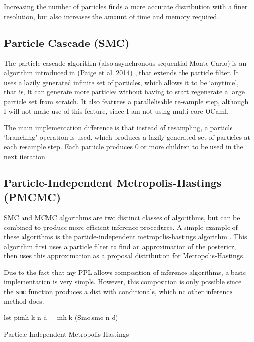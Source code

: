 Increasing the number of particles finds a more accurate distribution with a finer resolution, but also increases the amount of time and memory required.
				
\subsection{Particle Cascade (SMC)} \label{sec:pc}
The particle cascade algorithm (also asynchronous sequential Monte-Carlo) is an algorithm introduced in (Paige et al. 2014) \cite{paige2014asynchronous}, that extends the particle filter. It uses a lazily generated infinite set of particles, which allows it to be `anytime', that is, it can generate more particles without having to start regenerate a large particle set from scratch. It also features a parallelisable re-sample step, although I will not make use of this feature, since I am not using multi-core OCaml.
			
The main implementation difference is that instead of resampling, a particle `branching' operation is used, which produces a lazily generated set of particles at each resample step. Each particle produces 0 or more children to be used in the next iteration.
			
\subsection{Particle-Independent Metropolis-Hastings (PMCMC)} \label{sec:pimh}

SMC and MCMC algorithms are two distinct classes of algorithms, but can be combined to produce more efficient inference procedures. A simple example of these algorithms is the particle-independent metropolis-hastings algorithm \cite{pmcmc}. This algorithm first uses a particle filter to find an approximation of the posterior, then uses this approximation as a proposal distribution for Metropolis-Hastings.

Due to the fact that my PPL allows composition of inference algorithms, a basic implementation is very simple. However, this composition is only possible since the \texttt{smc} function produces a dist with conditionals, which no other inference method does.
				
			\begin{listing}
				\begin{ocamlcode-in}
					let pimh k n d = mh k (Smc.smc n d)
				\end{ocamlcode-in}
				\caption{Particle-Independent Metropolis-Hastings}
			\end{listing}

